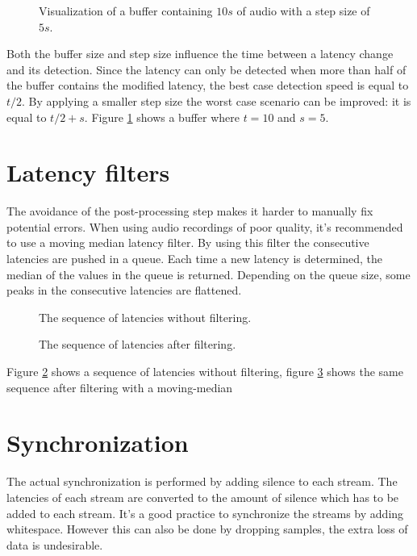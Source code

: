 \documentclass[twocolumn]{phdsymp} %
\begin{document}
\begin{figure}[ht]
	\begin{center}
		
		\caption{\label{buffers}Visualization of a buffer containing $10s$ of audio with a step size of $5s$.}
	\end{center}
\end{figure}

Both the buffer size and step size influence the time between a latency change and its detection. Since the latency can only be detected when more than half of the buffer contains the modified latency, the best case detection speed is equal to $ t/2 $. By applying a smaller step size the worst case scenario can be improved: it is equal to $ t/2 + s $. Figure \ref{buffers} shows a buffer where $t=10$ and $s=5$.


\section{Latency filters}
The avoidance of the post-processing step makes it harder to manually fix potential errors. When using audio recordings of poor quality, it's recommended to use a moving median latency filter. By using this filter the consecutive latencies are pushed in a queue. Each time a new latency is determined, the median of the values in the queue is returned. Depending on the queue size, some peaks in the consecutive latencies are flattened. 

\begin{figure}[th!]
	\begin{center}
		\caption{\label{latency_nofilter}The sequence of latencies without filtering.}
	\end{center}
\end{figure}

\begin{figure}[th!]
	\begin{center}
		\caption{\label{latency_filter}The sequence of latencies after filtering.}
	\end{center}
\end{figure}

Figure \ref{latency_nofilter} shows a sequence of latencies without filtering, figure \ref{latency_filter} shows the same sequence after filtering with a moving-median 
 
\section{Synchronization}
The actual synchronization is performed by adding silence to each stream. The latencies of each stream are converted to the amount of silence which has to be added to each stream. It's a good practice to synchronize the streams by adding whitespace. However this can also be done by dropping samples, the extra loss of data is undesirable.
\end{document}
